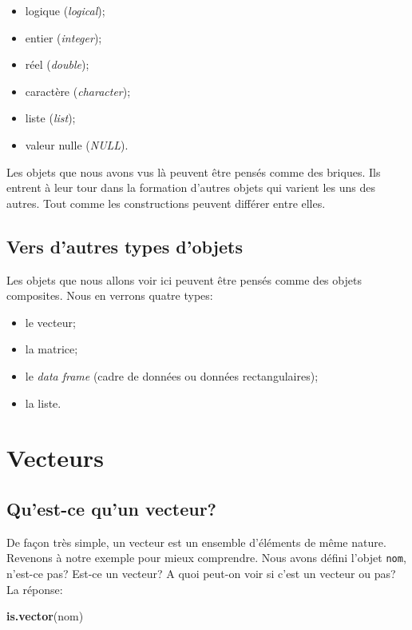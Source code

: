 \documentclass[]{book}
\newenvironment{Shaded}{\begin{snugshade}}{\end{snugshade}}
\newcommand{\KeywordTok}[1]{\textcolor[rgb]{0.13,0.29,0.53}{\textbf{#1}}}
\newcommand{\NormalTok}[1]{#1}
\begin{document}
\begin{itemize}
\item
  logique (\emph{logical});
\item
  entier (\emph{integer});
\item
  réel (\emph{double});
\item
  caractère (\emph{character});
\item
  liste (\emph{list});
\item
  valeur nulle (\emph{NULL}).
\end{itemize}

Les objets que nous avons vus là peuvent être pensés comme des briques.
Ils entrent à leur tour dans la formation d'autres objets qui varient
les uns des autres. Tout comme les constructions peuvent différer entre
elles.

\subsection{Vers d'autres types
d'objets}\label{vers-dautres-types-dobjets}

Les objets que nous allons voir ici peuvent être pensés comme des objets
composites. Nous en verrons quatre types:

\begin{itemize}
\item
  le vecteur;
\item
  la matrice;
\item
  le \emph{data frame} (cadre de données ou données rectangulaires);
\item
  la liste.
\end{itemize}

\section{Vecteurs}\label{vecteurs}

\subsection{Qu'est-ce qu'un vecteur?}\label{quest-ce-quun-vecteur}

De façon très simple, un vecteur est un ensemble d'éléments de même
nature. Revenons à notre exemple pour mieux comprendre. Nous avons
défini l'objet \texttt{nom}, n'est-ce pas? Est-ce un vecteur? A quoi
peut-on voir si c'est un vecteur ou pas? La réponse:

\begin{Shaded}
\begin{Highlighting}[]
\KeywordTok{is.vector}\NormalTok{(nom)}
\end{Highlighting}
\end{Shaded}
\end{document}
